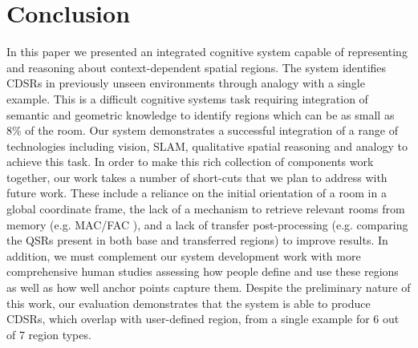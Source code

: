 \documentclass[letterpaper]{article}
\begin{document}

\section{Conclusion}

In this paper we presented an integrated cognitive system capable of representing and reasoning about context-dependent spatial regions. The system identifies CDSRs in previously unseen environments through analogy with a single example. This is a difficult cognitive systems task requiring integration of semantic and geometric knowledge to identify regions which can be as small as 8\% of the room. Our system demonstrates a successful integration of a range of technologies including vision, SLAM, qualitative spatial reasoning and analogy to achieve this task. In order to make this rich collection of components work together, our work takes a number of short-cuts that we plan to address with future work. These include a reliance on the initial orientation of a room in a global coordinate frame, the lack of a mechanism to retrieve relevant rooms from memory (e.g. MAC/FAC \cite{forbus/etal1995}), and a lack of transfer post-processing (e.g. comparing the QSRs present in both base and transferred regions) to improve results. In addition, we must complement our system development work with more comprehensive human studies assessing how people define and use these regions as well as how well anchor points capture them. Despite the preliminary nature of this work, our evaluation demonstrates that the system is able to produce CDSRs, which overlap with user-defined region, from a single example for 6 out of 7 region types.




% 

\clearpage



\end{document}
